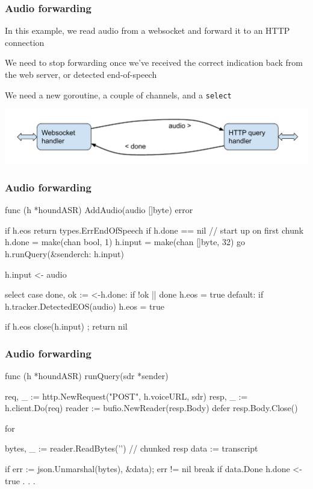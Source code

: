 \documentclass[handout,compress,t,11pt]{beamer}
\begin{document}
\begin{frame}[fragile]
    \frametitle{Audio forwarding}
    In this example, we read audio from a websocket and forward it
    to an HTTP connection \par
    \vspace{\baselineskip}
    We need to stop forwarding once we've received the correct
    indication back from the web server, or detected end-of-speech \par
    \vspace{\baselineskip}
    We need a new goroutine, a couple of channels, and a \verb|select|
    \vspace{\baselineskip}
\begin{center}
    \includegraphics[width=\textwidth]{audio-forward.pdf}
\end{center}
\end{frame}


\begin{frame}[fragile]
    \frametitle{Audio forwarding}
\begin{golang}
func (h *houndASR) AddAudio(audio []byte) error {
	if h.eos { return types.ErrEndOfSpeech }
	if h.done == nil { // start up on first chunk
		h.done = make(chan bool, 1)
		h.input = make(chan []byte, 32)
		go h.runQuery(&sender{ch: h.input})
	}

	h.input <- audio

	select {
	case done, ok := <-h.done:
		if !ok || done { h.eos = true }
	default:
		if h.tracker.DetectedEOS(audio) { h.eos = true }
	}

	if h.eos { close(h.input) }; return nil
}
\end{golang}
\end{frame}

\begin{frame}[fragile]
    \frametitle{Audio forwarding}
\begin{golang}
func (h *houndASR) runQuery(sdr *sender) {
	req, _ := http.NewRequest("POST", h.voiceURL, sdr)
    resp, _ := h.client.Do(req)
	reader := bufio.NewReader(resp.Body)
	defer resp.Body.Close()

	for {
		bytes, _ := reader.ReadBytes('\n') // chunked resp
		data := transcript{}

		if err := json.Unmarshal(bytes), &data); err != nil {
            break
        }
        if data.Done {
		    h.done <- true
        }
        . . .
    }
}
\end{golang}
\end{frame}
\end{document}
